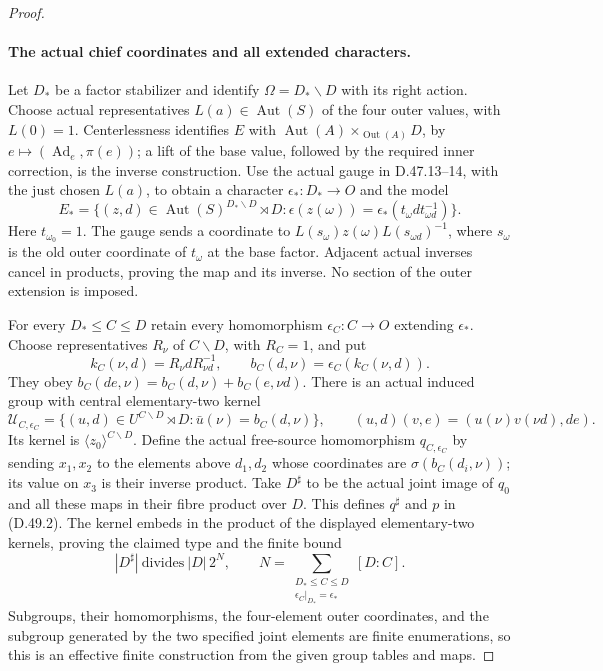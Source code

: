 \begin{proof}
\paragraph{The actual chief coordinates and all extended characters.}
Let \(D_*\) be a factor stabilizer and identify
\(\Omega=D_*\backslash D\) with its right action.
Choose actual representatives \(L(a)\in\operatorname{Aut}(S)\) of
the four outer values, with \(L(0)=1\).
Centerlessness identifies \(E\) with
\(\operatorname{Aut}(A)\times_{\operatorname{Out}(A)}D\), by
\(e\mapsto(\operatorname{Ad}_e,\pi(e))\); a lift of the base value,
followed by the required inner correction, is the inverse construction.
Use the actual gauge in D.47.13--14, with the just chosen \(L(a)\),
to obtain a character \(\epsilon_*:D_*\to O\) and the model
\[
 E_*=
 \{(z,d)\in\operatorname{Aut}(S)^{D_*\backslash D}\rtimes D:
       \epsilon(z(\omega))=\epsilon_*(t_\omega d t_{\omega d}^{-1})\}.
 \tag{D.49.16}
\]
Here \(t_{\omega_0}=1\). The gauge sends a coordinate to
\(L(s_\omega)z(\omega)L(s_{\omega d})^{-1}\), where
\(s_\omega\) is the old outer coordinate of \(t_\omega\) at the
base factor. Adjacent actual inverses cancel in products, proving the
map and its inverse. No section of the outer extension is imposed.

For every \(D_*\leq C\leq D\) retain every homomorphism
\(\epsilon_C:C\to O\) extending \(\epsilon_*\).
Choose representatives \(R_\nu\) of \(C\backslash D\), with
\(R_C=1\), and put
\[
 k_C(\nu,d)=R_\nu dR_{\nu d}^{-1},\qquad
 b_C(d,\nu)=\epsilon_C(k_C(\nu,d)).
 \tag{D.49.17}
\]
They obey \(b_C(de,\nu)=b_C(d,\nu)+b_C(e,\nu d)\).
There is an actual induced group with central elementary-two kernel
\[
 \mathcal U_{C,\epsilon_C}=
 \{(u,d)\in U^{C\backslash D}\rtimes D:
             \bar u(\nu)=b_C(d,\nu)\},\qquad
 (u,d)(v,e)=(u(\nu)v(\nu d),de).
 \tag{D.49.18}
\]
Its kernel is \(\langle z_0\rangle^{C\backslash D}\).
Define the actual free-source homomorphism \(q_{C,\epsilon_C}\)
by sending \(x_1,x_2\) to the elements above \(d_1,d_2\) whose
coordinates are \(\sigma(b_C(d_i,\nu))\); its value on \(x_3\)
is their inverse product. Take \(D^\sharp\) to be the actual joint
image of \(q_0\) and all these maps in their fibre product over \(D\).
This defines \(q^\sharp\) and \(p\) in \textup{(D.49.2)}.
The kernel embeds in the product of the displayed elementary-two
kernels, proving the claimed type and the finite bound
\[
 |D^\sharp|\ \text{divides}\ |D|\,2^N,
 \qquad
 N=\sum_{\substack{D_*\leq C\leq D\\
                  \epsilon_C|_{D_*}=\epsilon_*}}[D:C].
 \tag{D.49.19}
\]
Subgroups, their homomorphisms, the four-element outer coordinates,
and the subgroup generated by the two specified joint elements are
finite enumerations, so this is an effective finite construction from
the given group tables and maps.


\end{proof}
